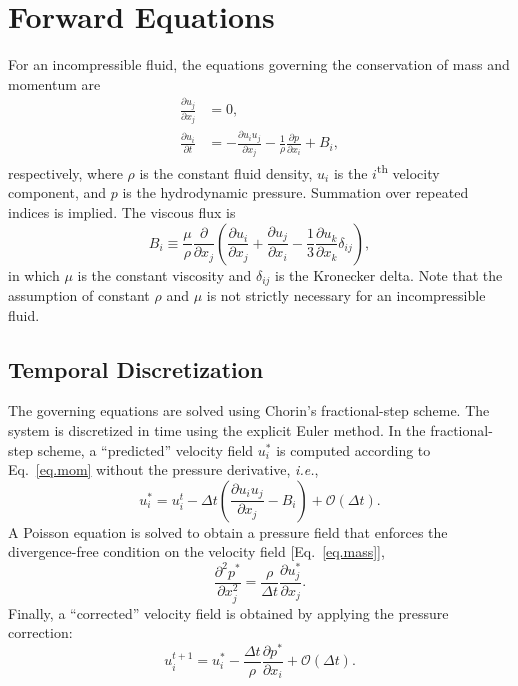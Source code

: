 \documentclass[letterpaper,10pt]{article}
\numberwithin{equation}{section}
\newcommand{\pp}[2]{\frac{\partial #1}{\partial #2}}
\begin{document}
\fancyhf{}
\fancyfoot[C]{\thepage}


\section{Forward Equations}

For an incompressible fluid, the equations governing the conservation
of mass and momentum are
\begin{align}
  \pp{u_j}{x_j} &= 0, \label{eq.mass}\\
  \pp{u_i}{t} &= -\pp{u_iu_j}{x_j} -\frac{1}{\rho}\pp{p}{x_i} + B_i, \label{eq.mom}
\end{align}
respectively, where $\rho$ is the constant fluid density, $u_i$ is the
$i$\textsuperscript{th} velocity component, and $p$ is the
hydrodynamic pressure. Summation over repeated indices is implied. The
viscous flux is
\begin{equation}
  B_i \equiv
  \frac{\mu}{\rho}\pp{}{x_j}\left(\pp{u_i}{x_j}+\pp{u_j}{x_i} -
  \frac{1}{3}\pp{u_k}{x_k}\delta_{ij}\right),
\end{equation}
in which $\mu$ is the constant viscosity and $\delta_{ij}$ is the
Kronecker delta. Note that the assumption of constant $\rho$ and $\mu$
is not strictly necessary for an incompressible fluid.


\subsection{Temporal Discretization}

The governing equations are solved using Chorin's fractional-step
scheme. The system is discretized in time using the explicit Euler
method. In the fractional-step scheme, a ``predicted'' velocity field
$u_i^*$ is computed according to Eq.~\eqref{eq.mom} without the
pressure derivative, \textit{i.e.},
\begin{equation}
  u_i^* = u_i^t - \Delta t\left(\pp{u_iu_j}{x_j} - B_i\right) + \mathcal{O}(\Delta t).
  \label{eq.predictor}
\end{equation}
A Poisson equation is solved to obtain a pressure field that enforces
the divergence-free condition on the velocity field
[Eq.~\eqref{eq.mass}],
\begin{equation}
  \frac{\partial^2 p^*}{\partial x_j^2} = \frac{\rho}{\Delta t}\pp{u_j^*}{x_j}.
  \label{eq.poisson}
\end{equation}
Finally, a ``corrected'' velocity field is obtained by applying the
pressure correction:
\begin{equation}
  u_i^{t+1} = u_i^* - \frac{\Delta t}{\rho}\pp{p^*}{x_i} + \mathcal{O}(\Delta t).
  \label{eq.corrector}
\end{equation}
\end{document}
